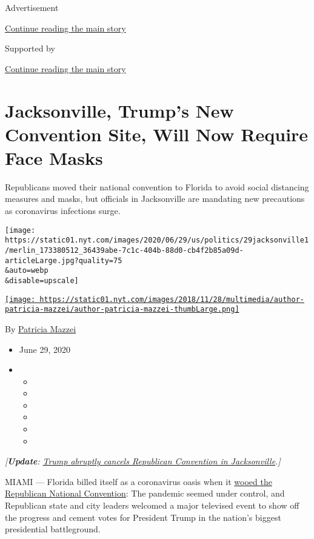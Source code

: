 Advertisement

\protect\hyperlink{after-top}{Continue reading the main story}

Supported by

\protect\hyperlink{after-sponsor}{Continue reading the main story}

\hypertarget{jacksonville-trumps-new-convention-site-will-now-require-face-masks}{%
\section{Jacksonville, Trump's New Convention Site, Will Now Require
Face
Masks}\label{jacksonville-trumps-new-convention-site-will-now-require-face-masks}}

Republicans moved their national convention to Florida to avoid social
distancing measures and masks, but officials in Jacksonville are
mandating new precautions as coronavirus infections surge.

\texttt{[image: https://static01.nyt.com/images/2020/06/29/us/politics/29jacksonville1/merlin\_173380512\_36439abe-7c1c-404b-88d0-cb4f2b85a09d-articleLarge.jpg?quality=75\\\&auto=webp\\\&disable=upscale]}

\href{https://www.nytimes.com/by/patricia-mazzei}{\texttt{[image: https://static01.nyt.com/images/2018/11/28/multimedia/author-patricia-mazzei/author-patricia-mazzei-thumbLarge.png]}}

By \href{https://www.nytimes.com/by/patricia-mazzei}{Patricia Mazzei}

\begin{itemize}
\item
  June 29, 2020
\item
  \begin{itemize}
  \item
  \item
  \item
  \item
  \item
  \item
  \end{itemize}
\end{itemize}

\emph{{[}\textbf{\textbf{Update}}:}
\href{https://www.nytimes.com/2020/07/23/us/politics/jacksonville-rnc.html}{\emph{Trump
abruptly cancels Republican Convention in Jacksonville}}\emph{.{]}}

MIAMI --- Florida billed itself as a coronavirus oasis when it
\href{https://www.nytimes.com/2020/06/11/us/politics/trump-jacksonville-rnc-speech.html}{wooed
the Republican National Convention}: The pandemic seemed under control,
and Republican state and city leaders welcomed a major televised event
to show off the progress and cement votes for President Trump in the
nation's biggest presidential battleground.

